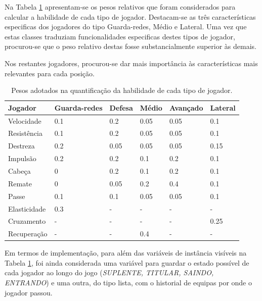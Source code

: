 \documentclass[11pt]{article}
\begin{document}
Na Tabela \ref{tab:habilidade} apresentam-se os pesos relativos que foram considerados para calcular a habilidade de cada tipo de jogador. Destacam-se as três características especificas dos jogadores do tipo Guarda-redes, Médio e Lateral. Uma vez que estas classes traduziam funcionalidades especificas destes tipos de jogador, procurou-se que o peso relativo destas fosse substancialmente superior às demais.

Nos restantes jogadores, procurou-se dar mais importância às características mais relevantes para cada posição.

\begin{table}[!h]
	\centering
	\caption{Pesos adotados na quantificação da habilidade de cada tipo de jogador.}
	\label{tab:habilidade}
	\begin{tabular}{|l|l|l|l|l|l|}
		\hline
		Jogador      & Guarda-redes & Defesa & Médio & Avançado & Lateral \\ \hline
		Velocidade   & 0.1          & 0.2    & 0.05  & 0.05     & 0.1     \\ \hline
		Resistência  & 0.1          & 0.2    & 0.05  & 0.05     & 0.1     \\ \hline
		Destreza     & 0.2          & 0.05   & 0.05  & 0.05     & 0.15    \\ \hline
		Impulsão     & 0.2          & 0.2    & 0.1   & 0.2      & 0.1     \\ \hline
		Cabeça       & 0            & 0.2    & 0.1   & 0.2      & 0.1     \\ \hline
		Remate       & 0            & 0.05   & 0.2   & 0.4      & 0.1     \\ \hline
		Passe        & 0.1          & 0.1    & 0.05  & 0.05     & 0.1     \\ \hline
		Elasticidade & 0.3          & -      & -     & -        & -       \\ \hline
		Cruzamento   & -            & -      & -     & -        & 0.25    \\ \hline
		Recuperação  & -            & -      & 0.4   & -        & -       \\ \hline
	\end{tabular}
\end{table}

Em termos de implementação, para além das variáveis de instância visíveis na Tabela \ref{tab:habilidade}, foi ainda considerada uma variável para guardar o estado possível de cada jogador ao longo do jogo (\textit{SUPLENTE, TITULAR, SAINDO, ENTRANDO}) e uma outra, do tipo lista, com o historial de equipas por onde o jogador passou.
\end{document}
